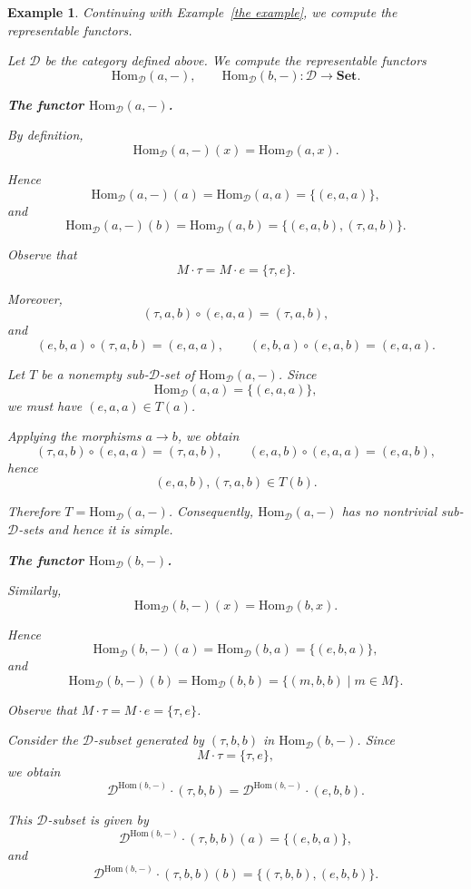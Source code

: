 \documentclass[a4paper]{article}
\newtheorem{exam}[thm]{Example}
\theoremstyle{definition}
\theoremstyle{remark}
\newcommand*{\cat}[1]{\mathcal{#1}}
\begin{document}
\begin{exam}
Continuing with Example~\ref{the example}, we compute the representable functors.

Let $\cat{D}$ be the category defined above. We compute the representable functors
\[
\mathrm{Hom}_{\cat{D}}(a,-), \qquad \mathrm{Hom}_{\cat{D}}(b,-) \colon \cat{D} \to \mathbf{Set}.
\]

\medskip

\textbf{The functor $\mathrm{Hom}_{\cat{D}}(a,-)$.}

By definition,
\[
\mathrm{Hom}_{\cat{D}}(a,-)(x)=\mathrm{Hom}_{\cat{D}}(a,x).
\]

Hence
\[
\mathrm{Hom}_{\cat{D}}(a,-)(a)=\mathrm{Hom}_{\cat{D}}(a,a)=\{(e,a,a)\},
\]
and
\[
\mathrm{Hom}_{\cat{D}}(a,-)(b)=\mathrm{Hom}_{\cat{D}}(a,b)
=\{(e,a,b),(\tau,a,b)\}.
\]

Observe that
\[
M\cdot \tau = M\cdot e = \{\tau,e\}.
\]

Moreover,
\[
(\tau,a,b)\circ (e,a,a)=(\tau,a,b),
\]
and
\[
(e,b,a)\circ (\tau,a,b)=(e,a,a), \qquad
(e,b,a)\circ (e,a,b)=(e,a,a).
\]

Let $T$ be a nonempty sub-$\cat{D}$-set of $\mathrm{Hom}_{\cat{D}}(a,-)$. Since
\[
\mathrm{Hom}_{\cat{D}}(a,a)=\{(e,a,a)\},
\]
we must have $(e,a,a)\in T(a)$.

Applying the morphisms $a\to b$, we obtain
\[
(\tau,a,b)\circ (e,a,a)=(\tau,a,b), \qquad
(e,a,b)\circ (e,a,a)=(e,a,b),
\]
hence
\[
(e,a,b),(\tau,a,b)\in T(b).
\]

Therefore $T=\mathrm{Hom}_{\cat{D}}(a,-)$. Consequently, $\mathrm{Hom}_{\cat{D}}(a,-)$ has no nontrivial sub-$\cat{D}$-sets and hence it is simple.

\medskip

\textbf{The functor $\mathrm{Hom}_{\cat{D}}(b,-)$.}

Similarly,
\[
\mathrm{Hom}_{\cat{D}}(b,-)(x)=\mathrm{Hom}_{\cat{D}}(b,x).
\]

Hence
\[
\mathrm{Hom}_{\cat{D}}(b,-)(a)=\mathrm{Hom}_{\cat{D}}(b,a)=\{(e,b,a)\},
\]
and
\[
\mathrm{Hom}_{\cat{D}}(b,-)(b)=\mathrm{Hom}_{\cat{D}}(b,b)
=\{(m,b,b)\mid m\in M\}.
\]

Observe that $M\cdot \tau = M\cdot e = \{\tau,e\}$. 

Consider the $\cat{D}$-subset generated by $(\tau,b,b)$ in $\mathrm{Hom}_{\cat{D}}(b,-)$. Since
\[
M\cdot \tau = \{\tau,e\},
\]
we obtain
\[
\cat{D}^{\mathrm{Hom}(b,-)}\cdot (\tau,b,b)
=
\cat{D}^{\mathrm{Hom}(b,-)}\cdot (e,b,b).
\]

This $\cat{D}$-subset is given by
\[
\cat{D}^{\mathrm{Hom}(b,-)}\cdot (\tau,b,b)(a)
=\{(e,b,a)\},
\]
and
\[
\cat{D}^{\mathrm{Hom}(b,-)}\cdot (\tau,b,b)(b)
=\{(\tau,b,b),(e,b,b)\}.
\]


\end{exam}
\end{document}

